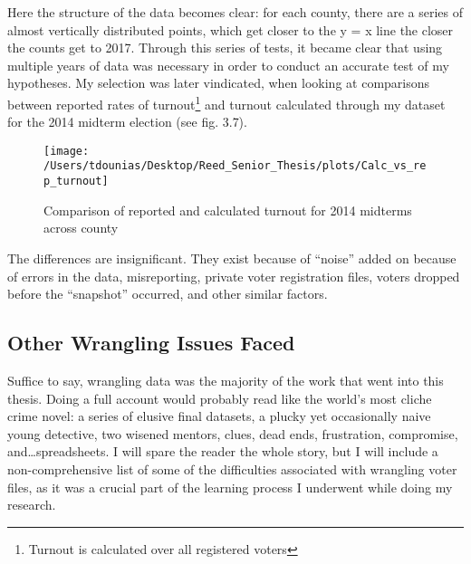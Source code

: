 \documentclass[12pt,twoside]{reedthesis}
\begin{document}
  Here the structure of the data becomes clear: for each county, there are
  a series of almost vertically distributed points, which get closer to
  the y = x line the closer the counts get to 2017. Through this series of
  tests, it became clear that using multiple years of data was necessary
  in order to conduct an accurate test of my hypotheses. My selection was
  later vindicated, when looking at comparisons between reported rates of
  turnout\footnote{Turnout is calculated over all registered voters} and
  turnout calculated through my dataset for the 2014 midterm election (see
  fig. 3.7).
  
  \begin{figure}
  
  {\centering \texttt{[image: /Users/tdounias/Desktop/Reed\_Senior\_Thesis/plots/Calc\_vs\_rep\_turnout]} 
  
  }
  
  \caption[Comparison of reported and calculated turnout for 2014 midterms across county]{Comparison of reported and calculated turnout for 2014 midterms across county}\label{fig:comp turnout 2014}
  \end{figure}
  
  The differences are insignificant. They exist because of ``noise'' added
  on because of errors in the data, misreporting, private voter
  registration files, voters dropped before the ``snapshot'' occurred, and
  other similar factors.
  
  \subsection{Other Wrangling Issues
  Faced}\label{other-wrangling-issues-faced}
  
  Suffice to say, wrangling data was the majority of the work that went
  into this thesis. Doing a full account would probably read like the
  world's most cliche crime novel: a series of elusive final datasets, a
  plucky yet occasionally naive young detective, two wisened mentors,
  clues, dead ends, frustration, compromise, and\ldots{}spreadsheets. I
  will spare the reader the whole story, but I will include a
  non-comprehensive list of some of the difficulties associated with
  wrangling voter files, as it was a crucial part of the learning process
  I underwent while doing my research.
  
\end{document}
